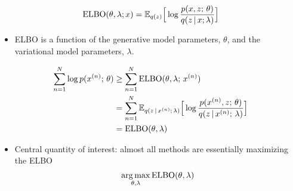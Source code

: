 
\begin{frame}
    \[ \operatorname*{ELBO}(\theta, \lambda; x) = \mathbb{E}_{q(z)}\Big[\log \frac{p(x, z ; \, \theta)}{q(z\,|\, x;\lambda)} \Big]\]
\begin{itemize}
    \item ELBO is a function of the generative model parameters, $\theta$, and the variational model parameters, $\lambda$.
\end{itemize}
\begin{align*}
    \sum_{n=1}^N \log p(x^{(n)} ; \, \theta) &\ge \sum_{n=1}^N \operatorname*{ELBO}(\theta, \lambda ; \, x^{(n)}) \\
    &= \sum_{n=1}^N \mathbb{E}_{q(z \,|\, x^{(n)} ; \, \lambda)}\Big[\log \frac{p(x^{(n)}, z ; \, \theta)}{q(z \,|\, x^{(n)} ; \, \lambda)} \Big] \\
    &= \operatorname*{ELBO}(\theta, \lambda)
\end{align*} 
\end{frame}

\begin{frame}

\begin{itemize}
    \item Central quantity of interest: almost all methods are essentially maximizing the ELBO
    \[ \argmax_{\theta, \lambda} \ELBO(\theta, \lambda)\] 
\end{itemize}
\end{frame}

